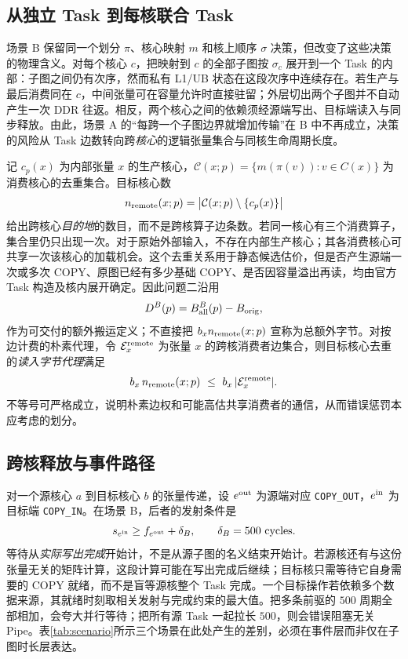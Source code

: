 \subsection{从独立 Task 到每核联合 Task}
场景 B 保留同一个划分 $\pi$、核心映射 $m$ 和核上顺序 $\sigma$ 决策，但改变了这些决策的物理含义。对每个核心 $c$，把映射到 $c$ 的全部子图按 $\sigma_c$ 展开到一个 Task 的内部：子图之间仍有次序，然而私有 L1/UB 状态在这段次序中连续存在。若生产与最后消费同在 $c$，中间张量可在容量允许时直接驻留；外层切出两个子图并不自动产生一次 DDR 往返。相反，两个核心之间的依赖须经源端写出、目标端读入与同步释放。由此，场景 A 的“每跨一个子图边界就增加传输”在 B 中不再成立，决策的风险从 Task 边数转向跨\emph{核心}的逻辑张量集合与同核生命周期长度。

记 $c_p(x)$ 为内部张量 $x$ 的生产核心，$\mathcal C(x;p)=\{m(\pi(v)):v\in C(x)\}$ 为消费核心的去重集合。目标核心数
\begin{equation}\label{eq:q2-destination-count}
n_{\rm remote}(x;p)=
\bigl|\mathcal C(x;p)\setminus\{c_p(x)\}\bigr|
\end{equation}
给出跨核心\emph{目的地}的数目，而不是跨核算子边条数。若同一核心有三个消费算子，集合里仍只出现一次。对于原始外部输入，不存在内部生产核心；其各消费核心可共享一次该核心的加载机会。这个去重关系用于静态候选估价，但是否产生源端一次或多次 COPY、原图已经有多少基础 COPY、是否因容量溢出再读，均由官方 Task 构造及核内展开确定。因此问题二沿用
\begin{equation}\label{eq:q2-added-exact}
D^B(p)=B_{\rm all}^{B}(p)-B_{\rm orig},
\end{equation}
作为可交付的额外搬运定义；不直接把 $b_x n_{\rm remote}(x;p)$ 宣称为总额外字节。对按边计费的朴素代理，令 $\mathcal E_x^{\rm remote}$ 为张量 $x$ 的跨核消费者边集合，则目标核心去重的\emph{读入字节代理}满足
\begin{equation}\label{eq:q2-dedup-inequality}
b_x\,n_{\rm remote}(x;p)
\ \le\ b_x\,|\mathcal E_x^{\rm remote}|.
\end{equation}
不等号可严格成立，说明朴素边权和可能高估共享消费者的通信，从而错误惩罚本应考虑的划分。

\subsection{跨核释放与事件路径}
对一个源核心 $a$ 到目标核心 $b$ 的张量传递，设 $e^{\rm out}$ 为源端对应 \texttt{COPY\_OUT}，$e^{\rm in}$ 为目标端 \texttt{COPY\_IN}。在场景 B，后者的发射条件是
\begin{equation}\label{eq:q2-sync-expanded}
s_{e^{\rm in}}\ge f_{e^{\rm out}}+\delta_B,
\qquad \delta_B=500\ {\rm cycles}.
\end{equation}
等待从\emph{实际写出完成}开始计，不是从源子图的名义结束开始计。若源核还有与这份张量无关的矩阵计算，这段计算可能在写出完成后继续；目标核只需等待它自身需要的 COPY 就绪，而不是盲等源核整个 Task 完成。一个目标操作若依赖多个数据来源，其就绪时刻取相关发射与完成约束的最大值。把多条前驱的 $500$ 周期全部相加，会夸大并行等待；把所有源 Task 一起拉长 $500$，则会错误阻塞无关 Pipe。表\ref{tab:scenario}所示三个场景在此处产生的差别，必须在事件层而非仅在子图时长层表达。

